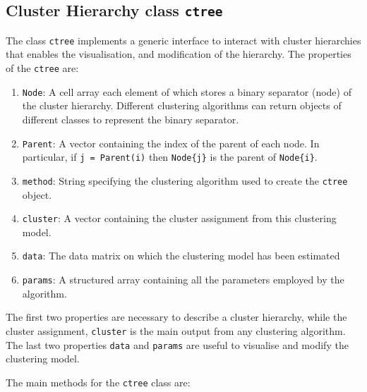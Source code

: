 \documentclass{book}
\begin{document}
\subsection*{Cluster Hierarchy class {\tt ctree}}

The class {\tt ctree} implements a generic interface to interact with cluster
hierarchies that enables the visualisation, and modification of the hierarchy.
%
The properties of the {\tt ctree} are:
%
\begin{enumerate}

\item {\tt Node}: A cell array each element of which stores a binary separator (node) of the
cluster hierarchy. Different clustering algorithms can return objects of different classes
to represent the binary separator.

\item {\tt Parent}: A vector containing the index of the parent of each node. In particular, if {\tt j = Parent(i)} then
{\tt Node\{j\}} is the parent of {\tt Node\{i\}}. 

\item {\tt method}: String specifying the clustering algorithm used to create the {\tt ctree} object.

\item {\tt cluster}: A vector containing the cluster assignment from this clustering model.

\item {\tt data}: The data matrix on which the clustering model has been estimated

\item {\tt params}: A structured array containing all the parameters employed by the
algorithm.

\end{enumerate}

The first two properties are necessary to describe a cluster hierarchy, while
the cluster assignment, {\tt cluster} is the main output from any clustering
algorithm. The last two properties {\tt data} and {\tt params} are useful to
visualise and modify the clustering model.

The main methods for the {\tt ctree} class are:
\end{document}
